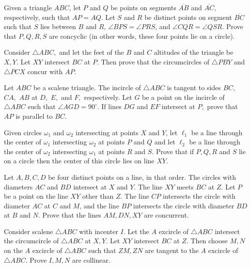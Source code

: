 \documentclass[mast]{lucky}
\begin{document}
\begin{req}[USAJMO 2012/1]{3}
Given a triangle $ABC$, let $P$ and $Q$ be points on segments $\overline{AB}$ and $\overline{AC}$, respectively, such that $AP=AQ$. Let $S$ and $R$ be distinct points on segment $\overline{BC}$ such that $S$ lies between $B$ and $R$, $\angle BPS=\angle PRS$, and $\angle CQR=\angle QSR$. Prove that $P,Q,R,S$ are concyclic (in other words, these four points lie on a circle).
\end{req}

\begin{prob}{3}
Consider $\triangle ABC,$ and let the feet of the $B$ and $C$ altitudes of the triangle be $X,Y.$ Let $XY$ intersect $BC$ at $P.$ Then prove that the circumcircles of $\triangle PBY$ and $\triangle PCX$ concur with $AP.$
\end{prob} 

\begin{prob}[GOTEEM 1]{4}
Let $ABC$ be a scalene triangle. The incircle of $\triangle ABC$ is tangent to sides $BC,$ $CA,$ $AB$ at $D,$ $E,$ and $F,$ respectively. Let $G$ be a point on the incircle of $\triangle ABC$ such that $\angle AGD = 90^{\circ}.$ If lines $DG$ and $EF$ intersect at $P,$ prove that $AP$ is parallel to $BC.$
\end{prob}

\begin{prob}[USAMO 2009/1]{4}
Given circles $\omega_1$ and $\omega_2$ intersecting at points $X$ and $Y$, let $\ell_1$ be a line through the center of $\omega_1$ intersecting $\omega_2$ at points $P$ and $Q$ and let $\ell_2$ be a line through the center of $\omega_2$ intersecting $\omega_1$ at points $R$ and $S$. Prove that if $P, Q, R$ and $S$ lie on a circle then the center of this circle lies on line $XY$.
\end{prob}

\begin{prob}[IMO 1995/1]{4}
Let $A,B,C,D$ be four distinct points on a line, in that order. The circles with diameters $AC$ and $BD$ intersect at $X$ and $Y$. The line $XY$ meets $BC$ at $Z$. Let $P$ be a point on the line $XY$ other than $Z$. The line $CP$ intersects the circle with diameter $AC$ at $C$ and $M$, and the line $BP$ intersects the circle with diameter $BD$ at $B$ and $N$. Prove that the lines $AM,DN,XY$ are concurrent.
\end{prob}

\begin{prob}[]{6}
Consider scalene $\triangle ABC$ with incenter $I.$ Let the $A$ excircle of $\triangle ABC$ intersect the circumcircle of $\triangle ABC$ at $X,Y.$ Let $XY$ intersect $BC$ at $Z.$ Then choose $M,N$ on the $A$ excircle of $\triangle ABC$ such that $ZM,ZN$ are tangent to the $A$ excircle of $\triangle ABC.$ Prove $I,M,N$ are collinear.
\end{prob}
\end{document}
